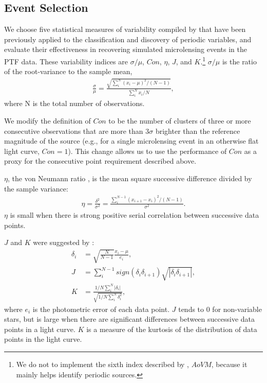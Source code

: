 \documentclass{emulateapj}
\begin{document}
\subsection{Event Selection} \label{sec:event_selection}
We choose five statistical measures of variability compiled by \cite{shin2009} that have been previously applied to the classification and discovery of periodic variables, and evaluate their effectiveness in recovering simulated microlensing events in the PTF data. These variability indices are $\sigma/\mu$, $Con$, $\eta$, $J$, and $K$.\footnote{We do not to implement the sixth index described by \cite{shin2009}, $AoVM$, because it mainly helps identify periodic sources.} $\sigma/\mu$ is the ratio of the root-variance to the sample mean, 
\begin{align}
	\frac{\sigma}{\mu} = \frac{\sqrt{\sum^N_i (x_i - \mu)^2 / (N-1)}}{\sum^N_i x_i/N},
\end{align}
where N is the total number of observations. 

We modify the definition of $Con$ to be the number of clusters of three or more consecutive observations that are more than $3\sigma$ brighter than the reference magnitude of the source (e.g., for a single microlensing event in an otherwise flat light curve, $Con=1$). This change allows us to use the performance of $Con$ as a proxy for the consecutive point requirement described above. 

$\eta$, the von Neumann ratio \citep{von_neumann1941}, is the mean square successive difference divided by the sample variance:
\begin{align}
	\eta = \frac{\delta^2}{\sigma^2} = \frac{\sum^{N-1}_i(x_{i+1} - x_i)^2/(N-1)}{\sigma^2}.
\end{align}
$\eta$ is small when there is strong positive serial correlation between successive data points. 

$J$ and $K$ were suggested by \cite{stetson1996}:
\begin{align}
	\delta_i &= \sqrt{\frac{N}{N-1}}\frac{x_i-\mu}{e_i},\\
	J &= \sum^{N-1}_i sign(\delta_i \delta_{i+1})\sqrt{|\delta_i \delta_{i+1}|},\\
	K &= \frac{1/N\sum^N_i |\delta_i|}{\sqrt{1/N\sum^N_i\delta_i^2}},
\end{align}
where $e_i$ is the photometric error of each data point. $J$ tends to 0 for non-variable stars, but is large when there are significant differences between successive data points in a light curve. $K$ is a measure of the kurtosis of the distribution of data points in the light curve.
\end{document}
